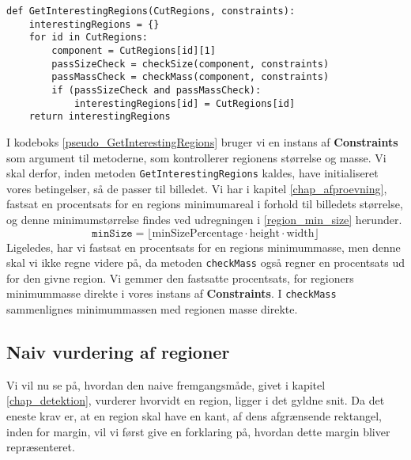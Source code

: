 {\begin{lstlisting}[caption={Metode som returnerer kun de insteressante
    regioner, givet en instans af $\angles{CutRegions}$}, captionpos=b,
    label={pseudo_GetInterestingRegions}, frame=tb, breaklines=false,
    float=t]
def GetInterestingRegions(CutRegions, constraints):
    interestingRegions = {}
    for id in CutRegions:
        component = CutRegions[id][1]
        passSizeCheck = checkSize(component, constraints)
        passMassCheck = checkMass(component, constraints)
        if (passSizeCheck and passMassCheck):
            interestingRegions[id] = CutRegions[id]
    return interestingRegions
\end{lstlisting}

I kodeboks \ref{pseudo_GetInterestingRegions} bruger vi en instans af
\textbf{Constraints} som argument til metoderne, som kontrollerer
regionens størrelse og masse. Vi skal derfor, inden metoden
\texttt{GetInterestingRegions} kaldes, have initialiseret vores
betingelser, så de passer til billedet. Vi har i kapitel
\ref{chap_afproevning}, fastsat en procentsats for en regions
minimumareal i forhold til billedets størrelse, og denne
minimumstørrelse findes ved udregningen i \eqref{region_min_size}
herunder.
\begin{equation}
    \mathtt{minSize} =
    \lfloor
    \mathrm{minSizePercentage}\cdot\mathrm{height}\cdot\mathrm{width}
    \rfloor
    \label{region_min_size}
\end{equation}
Ligeledes, har vi fastsat en procentsats for en regions minimummasse, men denne
skal vi ikke regne videre på, da metoden \texttt{checkMass} også regner
en procentsats ud for den givne region. Vi gemmer den fastsatte
procentsats, for regioners minimummasse direkte i vores instans af
\textbf{Constraints}. I \texttt{checkMass} sammenlignes minimummassen
med regionen masse direkte.

\subsection{Naiv vurdering af regioner}
Vi vil nu se på, hvordan den naive fremgangsmåde, givet i kapitel
\ref{chap_detektion}, vurderer hvorvidt en region, ligger i det gyldne
snit. Da det eneste krav er, at en region skal have en kant, af dens
afgrænsende rektangel, inden for margin, vil vi først give en forklaring
på, hvordan dette margin bliver repræsenteret.

}
